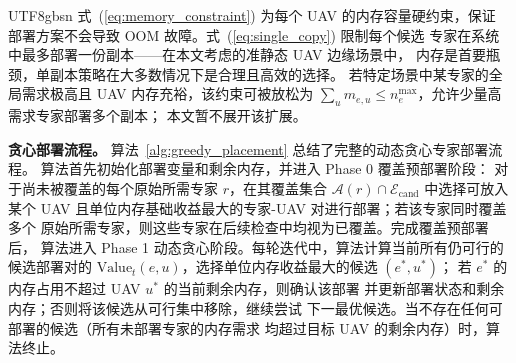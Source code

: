 \documentclass[conference]{IEEEtran}
\begin{document}
\begin{CJK*}{UTF8}{gbsn}
式~(\ref{eq:memory_constraint}) 为每个 UAV 的内存容量硬约束，保证
部署方案不会导致 OOM 故障。式~(\ref{eq:single_copy}) 限制每个候选
专家在系统中最多部署一份副本——在本文考虑的准静态 UAV 边缘场景中，
内存是首要瓶颈，单副本策略在大多数情况下是合理且高效的选择。
若特定场景中某专家的全局需求极高且 UAV 内存充裕，该约束可被放松为
$\sum_u m_{e,u} \le n_e^{\max}$，允许少量高需求专家部署多个副本；
本文暂不展开该扩展。

\textbf{贪心部署流程。}
算法~\ref{alg:greedy_placement} 总结了完整的动态贪心专家部署流程。
算法首先初始化部署变量和剩余内存，并进入 Phase 0 覆盖预部署阶段：
对于尚未被覆盖的每个原始所需专家 $r$，在其覆盖集合
$\mathcal{A}(r)\cap\mathcal{E}_{\mathrm{cand}}$ 中选择可放入某个 UAV
且单位内存基础收益最大的专家-UAV 对进行部署；若该专家同时覆盖多个
原始所需专家，则这些专家在后续检查中均视为已覆盖。完成覆盖预部署后，
算法进入 Phase 1 动态贪心阶段。每轮迭代中，算法计算当前所有仍可行的候选部署对的
$\mathrm{Value}_t(e,u)$，选择单位内存收益最大的候选 $(e^*,u^*)$；
若 $e^*$ 的内存占用不超过 UAV $u^*$ 的当前剩余内存，则确认该部署
并更新部署状态和剩余内存；否则将该候选从可行集中移除，继续尝试
下一最优候选。当不存在任何可部署的候选（所有未部署专家的内存需求
均超过目标 UAV 的剩余内存）时，算法终止。


\end{CJK*}
\end{document}
